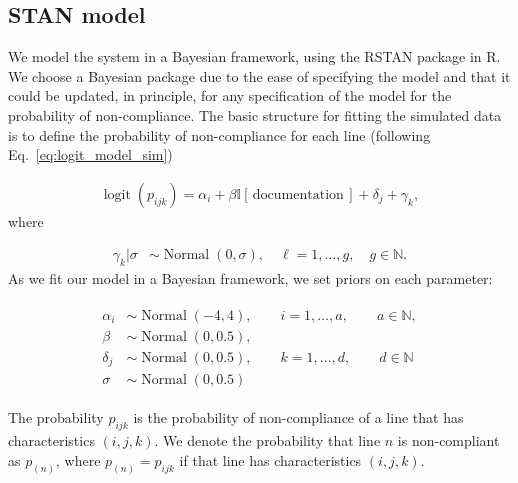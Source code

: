 \documentclass[aoas]{imsart}
\DeclareMathOperator{\logit}{logit}
\DeclareMathOperator{\Normal}{Normal}
\begin{document}
\subsection{STAN model}
We model the system in a Bayesian framework, using the RSTAN package in R. We choose a Bayesian package due to the ease of specifying the model and {that it} could be updated, in principle, for any specification of the model for the probability of non-compliance. The basic structure for fitting the simulated data is to define the probability of non-compliance for each line (following Eq.~\eqref{eq:logit_model_sim})

\begin{align}
\logit(p_{ijk}) = \alpha_{i} + \beta\mathbb{I}[\,\text{documentation}\,] + \delta_j + \gamma_k, \label{eq:logit_model_fit_sim}
\end{align}
where 

\begin{align}
\gamma_k | \sigma &\sim \Normal(0, \sigma), \quad  \ell = 1,\ldots, g, \quad  g \in \mathbb{N}.
\end{align}
As we fit our model in a Bayesian framework, we set priors on each parameter:

\begin{align}
\begin{split}
\alpha_i &\sim \Normal(-4, 4), \quad \quad i=1, \ldots, a,\quad \quad  a\in \mathbb{N},\\
\beta &\sim \Normal(0, 0.5),\\
\delta_j &\sim \Normal(0, 0.5),\quad \quad  k = 1,\ldots, d, \quad \quad d \in \mathbb{N}\\
\sigma &\sim \Normal(0, 0.5)
\end{split}
\end{align}

The probability $p_{ijk}$ is the probability of non-compliance of a line that has characteristics $(i,j,k)$. We denote the probability that line $n$ is non-compliant as $p_{(n)}$, where $p_{(n)} = p_{ijk}$ if that line has characteristics $(i,j,k)$.
\end{document}
